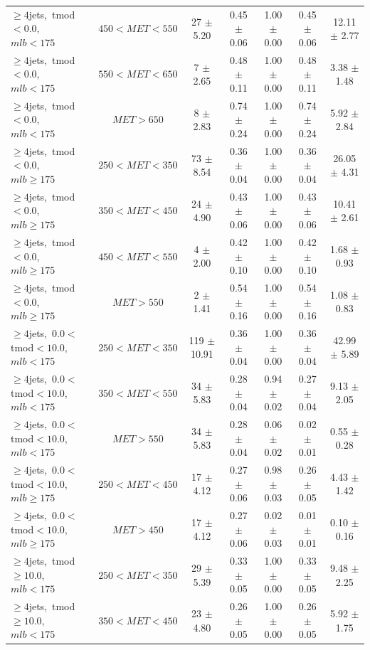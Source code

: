 \begin{table}
{\begin{tabular}{|l|c|c|c|c|c|c|}
 $\ge4$jets,~tmod$<0.0$,~$mlb<175$ & $450<MET<550$  & 27 $\pm$ 5.20  & 0.45 $\pm$ 0.06  & 1.00 $\pm$ 0.00 & 0.45 $\pm$ 0.06  & 12.11 $\pm$ 2.77  \\
 $\ge4$jets,~tmod$<0.0$,~$mlb<175$ & $550<MET<650$  & 7 $\pm$ 2.65  & 0.48 $\pm$ 0.11  & 1.00 $\pm$ 0.00 & 0.48 $\pm$ 0.11  & 3.38 $\pm$ 1.48  \\
 $\ge4$jets,~tmod$<0.0$,~$mlb<175$ & $MET>650$  & 8 $\pm$ 2.83  & 0.74 $\pm$ 0.24  & 1.00 $\pm$ 0.00 & 0.74 $\pm$ 0.24  & 5.92 $\pm$ 2.84  \\
\hline
 $\ge4$jets,~tmod$<0.0$,~$mlb\ge175$ & $250<MET<350$  & 73 $\pm$ 8.54  & 0.36 $\pm$ 0.04  & 1.00 $\pm$ 0.00 & 0.36 $\pm$ 0.04  & 26.05 $\pm$ 4.31  \\
 $\ge4$jets,~tmod$<0.0$,~$mlb\ge175$ & $350<MET<450$  & 24 $\pm$ 4.90  & 0.43 $\pm$ 0.06  & 1.00 $\pm$ 0.00 & 0.43 $\pm$ 0.06  & 10.41 $\pm$ 2.61  \\
 $\ge4$jets,~tmod$<0.0$,~$mlb\ge175$ & $450<MET<550$  & 4 $\pm$ 2.00  & 0.42 $\pm$ 0.10  & 1.00 $\pm$ 0.00 & 0.42 $\pm$ 0.10  & 1.68 $\pm$ 0.93  \\
 $\ge4$jets,~tmod$<0.0$,~$mlb\ge175$ & $MET>550$  & 2 $\pm$ 1.41  & 0.54 $\pm$ 0.16  & 1.00 $\pm$ 0.00 & 0.54 $\pm$ 0.16  & 1.08 $\pm$ 0.83  \\
\hline
 $\ge4$jets,~$0.0<$tmod$<10.0$,~$mlb<175$ & $250<MET<350$  & 119 $\pm$ 10.91  & 0.36 $\pm$ 0.04  & 1.00 $\pm$ 0.00 & 0.36 $\pm$ 0.04  & 42.99 $\pm$ 5.89  \\
 $\ge4$jets,~$0.0<$tmod$<10.0$,~$mlb<175$ & $350<MET<550$  & 34 $\pm$ 5.83  & 0.28 $\pm$ 0.04  & 0.94 $\pm$ 0.02 & 0.27 $\pm$ 0.04  & 9.13 $\pm$ 2.05  \\
 $\ge4$jets,~$0.0<$tmod$<10.0$,~$mlb<175$ & $MET>550$  & 34 $\pm$ 5.83  & 0.28 $\pm$ 0.04  & 0.06 $\pm$ 0.02 & 0.02 $\pm$ 0.01  & 0.55 $\pm$ 0.28  \\
\hline
 $\ge4$jets,~$0.0<$tmod$<10.0$,~$mlb\ge175$ & $250<MET<450$  & 17 $\pm$ 4.12  & 0.27 $\pm$ 0.06  & 0.98 $\pm$ 0.03 & 0.26 $\pm$ 0.05  & 4.43 $\pm$ 1.42  \\
 $\ge4$jets,~$0.0<$tmod$<10.0$,~$mlb\ge175$ & $MET>450$  & 17 $\pm$ 4.12  & 0.27 $\pm$ 0.06  & 0.02 $\pm$ 0.03 & 0.01 $\pm$ 0.01  & 0.10 $\pm$ 0.16  \\
\hline
 $\ge4$jets,~tmod$\ge10.0$,~$mlb<175$ & $250<MET<350$  & 29 $\pm$ 5.39  & 0.33 $\pm$ 0.05  & 1.00 $\pm$ 0.00 & 0.33 $\pm$ 0.05  & 9.48 $\pm$ 2.25  \\
 $\ge4$jets,~tmod$\ge10.0$,~$mlb<175$ & $350<MET<450$  & 23 $\pm$ 4.80  & 0.26 $\pm$ 0.05  & 1.00 $\pm$ 0.00 & 0.26 $\pm$ 0.05  & 5.92 $\pm$ 1.75  \\

\end{tabular}}
\end{table}
